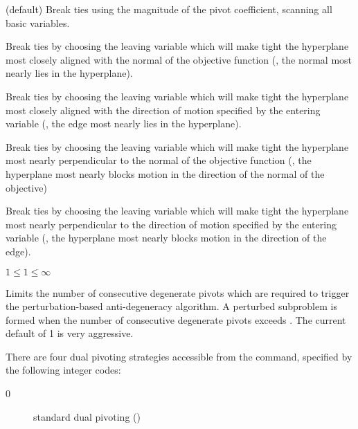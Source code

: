 \begin{codedoc}
\begin{description}[0 (\kw{pivotabort})]
    \item[1 (\kw{pivot})] (default)
    Break ties using the magnitude of the pivot coefficient, scanning all
    basic variables.

    \item[2 (\kw{alignobj})]
    Break ties by choosing the leaving variable which will make tight the
    hyperplane most closely aligned with the normal of the objective
    function (\ie, the normal most nearly lies in the hyperplane).

    \item[3 (\kw{alignedge})]
    Break ties by choosing the leaving variable which will make tight the
    hyperplane most closely aligned with the direction of motion specified
    by the entering variable (\ie, the edge most nearly lies in the
    hyperplane).

    \item[4 (\kw{perpobj})]
    Break ties by choosing the leaving variable which will make tight the
    hyperplane most nearly perpendicular to the normal of the objective
    function (\ie, the hyperplane most nearly blocks motion in the direction
    of the normal of the objective)

    \item[5 (\kw{perpedge})]
    Break ties by choosing the leaving variable which will make tight the
    hyperplane most nearly perpendicular to the direction of motion specified
    by the entering variable (\ie, the hyperplane most nearly blocks motion
    in the direction of the edge).
  \end{description}


  \item{}
    \kw{;}

  $1 \leq 1 \leq \infty$

  Limits the number of consecutive degenerate pivots which are
  required to trigger the perturbation-based anti-degeneracy algorithm.
  A perturbed subproblem is formed when the number of consecutive degenerate
  pivots exceeds .
  The current default of 1 is very aggressive.

  \item{}

    \kw{;}

  There are four dual pivoting strategies accessible from the
   command, specified by the following integer codes:
  \begin{description}
    \item[0] standard dual pivoting
	     (\vid {})


\end{description}
\end{codedoc}
